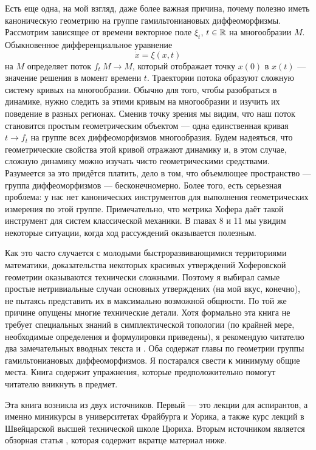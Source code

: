 Есть еще одна, на мой взгляд, даже более важная причина, почему полезно иметь каноническую геометрию на группе гамильтониановых диффеоморфизмы.
Рассмотрим зависящее от времени векторное поле $\xi_t$, $t\in \mathbb{R}$ на многообразии $M$.
Обыкновенное дифференциальное уравнение
\[\dot x=\xi(x,t)\]
на $M$ определяет поток $f_t\: M \to M$, который отображает точку $x(0)$ в $x(t)$ --- значение решения в момент времени $t$.
Траектории потока образуют сложную систему кривых на многообразии.
Обычно для того, чтобы разобраться в динамике, нужно следить за этими кривым на многообразии и изучить их поведение в разных регионах.
Сменив точку зрения мы видим, что наш поток становится простым геометрическим объектом --- одна единственная кривая $t \to f_t$ на группе всех диффеоморфизмов многообразия.
Будем надеяться, что геометрические свойства этой кривой отражают динамику и, в этом случае, сложную динамику можно изучать чисто геометрическими средствами.
Разумеется за это придётся платить, дело в том, что объемлющее пространство --- группа
диффеоморфизмов --- бесконечномерно.
Более того, есть серьезная проблема:
у нас нет канонических инструментов для выполнения геометрических измерения по этой группе.
Примечательно, что метрика Хофера даёт такой инструмент для систем классической механики.
В главах 8 и 11 мы увидим некоторые ситуации, когда ход рассуждений оказывается полезным.

Как это часто случается с молодыми быстроразвивающимися территориями математики, доказательства некоторых красивых утверждений Хоферовской геометрии оказываются технически сложными.
Поэтому я выбирал самые простые нетривиальные случаи основных утверждених (на мой вкус, конечно), не пытаясь представить их в максимально возможной общности.
По той же причине опущены многие технические детали.
Хотя формально эта книга не требует специальных знаний в симплектической топологии (по крайней мере, необходимые определения и формулировки приведены), я рекомендую читателю  два замечательных вводных текста \cite{HZ} и \cite{MS}.
Оба содержат главы по геометрии группы гамильтониановых диффеоморфизмов.
Я постарался свести к минимуму общие места.
Книга содержит упражнения, которые предположительно помогут читателю вникнуть в предмет.

Эта книга возникла из двух источников.
Первый --- это лекции для аспирантов, а именно миникурсы в университетах Фрайбурга и Уорика, а также курс лекций в Швейцарской высшей технической школе Цюриха.
Вторым источником является обзорная статья \cite{P8}, которая содержит вкратце материал ниже.

